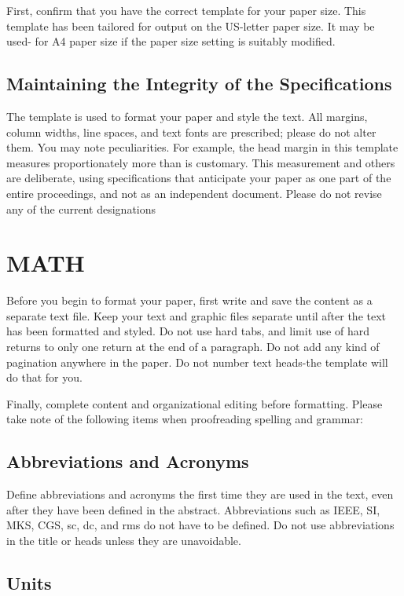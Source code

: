 \documentclass[letterpaper, 10 pt, conference]{ieeeconf}  %
\begin{document}
First, confirm that you have the correct template for your paper size. This template has been tailored for output on the US-letter paper size. 
It may be used- for A4 paper size if the paper size setting is suitably modified.

\subsection{Maintaining the Integrity of the Specifications}

The template is used to format your paper and style the text. All margins, column widths, line spaces, and text fonts are prescribed; please do not alter them. You may note peculiarities. For example, the head margin in this template measures proportionately more than is customary. This measurement and others are deliberate, using specifications that anticipate your paper as one part of the entire proceedings, and not as an independent document. Please do not revise any of the current designations

\section{MATH}

Before you begin to format your paper, first write and save the content as a separate text file. Keep your text and graphic files separate until after the text has been formatted and styled. Do not use hard tabs, and limit use of hard returns to only one return at the end of a paragraph. Do not add any kind of pagination anywhere in the paper. Do not number text heads-the template will do that for you.

Finally, complete content and organizational editing before formatting. Please take note of the following items when proofreading spelling and grammar:

\subsection{Abbreviations and Acronyms} Define abbreviations and acronyms the first time they are used in the text, even after they have been defined in the abstract. Abbreviations such as IEEE, SI, MKS, CGS, sc, dc, and rms do not have to be defined. Do not use abbreviations in the title or heads unless they are unavoidable.

\subsection{Units}
\end{document}
